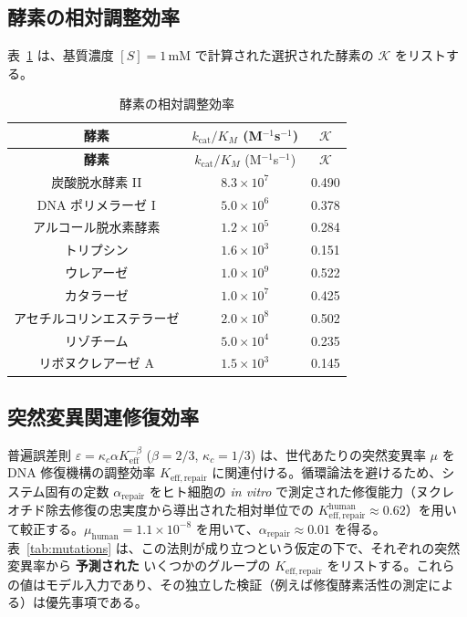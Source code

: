 \documentclass[12pt,a4paper]{ltjsarticle}
\newcommand{\REL}{\mathcal{K}}          %
\begin{document}
	\subsection{酵素の相対調整効率}
	\label{sec:enzymes}
	表~\ref{tab:enzymes} は、基質濃度 \([S]=1\,\text{mM}\) で計算された選択された酵素の \(\REL\) をリストする。
	
	\begin{longtable}{|c|c|c|}
		\caption{酵素の相対調整効率}\label{tab:enzymes}\\
		\hline
		\textbf{酵素} & \(k_{\mathrm{cat}}/K_M\) (M\(^{-1}\)s\(^{-1}\)) & \(\REL\) \\
		\hline
		\endfirsthead
		\hline
		\textbf{酵素} & \(k_{\mathrm{cat}}/K_M\) (M\(^{-1}\)s\(^{-1}\)) & \(\REL\) \\
		\hline
		\endhead
		\hline
		炭酸脱水酵素 II & \(8.3\times10^7\) & 0.490 \\
		DNA ポリメラーゼ I & \(5.0\times10^6\) & 0.378 \\
		アルコール脱水素酵素 & \(1.2\times10^5\) & 0.284 \\
		トリプシン & \(1.6\times10^3\) & 0.151 \\
		ウレアーゼ & \(1.0\times10^9\) & 0.522 \\
		カタラーゼ & \(1.0\times10^7\) & 0.425 \\
		アセチルコリンエステラーゼ & \(2.0\times10^8\) & 0.502 \\
		リゾチーム & \(5.0\times10^4\) & 0.235 \\
		リボヌクレアーゼ A & \(1.5\times10^3\) & 0.145 \\
		\hline
	\end{longtable}
	
	\subsection{突然変異関連修復効率}
	\label{sec:mutations}
	普遍誤差則 \(\varepsilon = \kappa_c \alpha K_{\mathrm{eff}}^{-\beta}\) (\(\beta=2/3\), \(\kappa_c=1/3\)) は、世代あたりの突然変異率 \(\mu\) を DNA 修復機構の調整効率 \(K_{\mathrm{eff,repair}}\) に関連付ける。循環論法を避けるため、システム固有の定数 \(\alpha_{\mathrm{repair}}\) をヒト細胞の \textit{in vitro} で測定された修復能力（ヌクレオチド除去修復の忠実度から導出された相対単位での \(K_{\mathrm{eff,repair}}^{\mathrm{human}} \approx 0.62\)）を用いて較正する。\(\mu_{\mathrm{human}}=1.1\times10^{-8}\) を用いて、\(\alpha_{\mathrm{repair}} \approx 0.01\) を得る。表~\ref{tab:mutations} は、この法則が成り立つという仮定の下で、それぞれの突然変異率から \textbf{予測された} いくつかのグループの \(K_{\mathrm{eff,repair}}\) をリストする。これらの値はモデル入力であり、その独立した検証（例えば修復酵素活性の測定による）は優先事項である。
	
\end{document}
